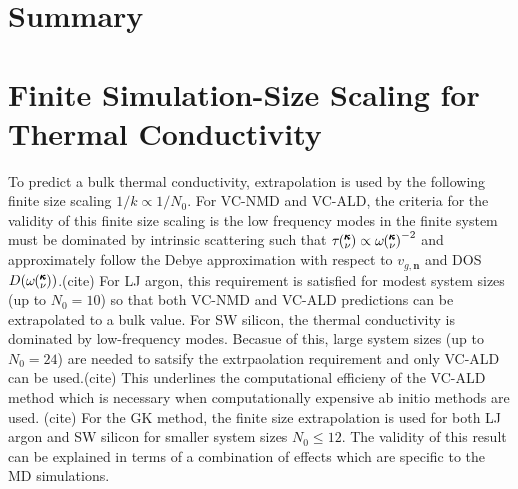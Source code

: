 \documentclass[aps,prb,twocolumn,superscriptaddress,preprintnumbers,amsmath,amssymb,floatfix]{revtex4}
\newcommand{\kv}{\mspace{-4.0mu}\left(\mspace{-8.0mu}
\begin{smallmatrix}&\pmb{\kappa} \\&\nu\end{smallmatrix}
\mspace{-3.0mu}\right)}
\begin{document}
\section{\label{S:}Summary}


\appendix

\section{\label{A-Finite-Sim}Finite Simulation-Size Scaling for Thermal 
Conductivity}
To predict a bulk thermal conductivity, extrapolation is used by the 
following finite size scaling $ 1 / k \propto 1/N_0$. For VC-NMD and 
VC-ALD, the criteria for the validity of this finite size scaling 
is the low frequency modes in the finite system must be dominated by 
intrinsic scattering such that $\tau\kv \propto \omega\kv^{-2}$ 
and approximately follow the Debye approximation 
with respect to $v_{g,\mathbf{n}}$ and DOS $D(\omega\kv)$.(cite) For LJ 
argon, this requirement is satisfied for modest system sizes 
(up to $N_0 = 10$) so that both VC-NMD and VC-ALD predictions can be 
extrapolated to a bulk value. 
For SW silicon, the thermal conductivity is dominated by low-frequency 
modes. Becasue of this, large system sizes (up to $N_0 = 24$) are needed 
to satsify the 
extrpaolation requirement and only VC-ALD can be used.(cite) This 
underlines the computational efficieny of the VC-ALD method which is 
necessary when computationally expensive ab initio methods are used.
(cite) For the GK method, the finite size extrapolation is used for 
both LJ argon and SW silicon for smaller system sizes $N_0 \le 12$. 
The validity of this result can be explained in terms of a 
combination of effects which are specific to the MD simulations.
\cite{esfarjani_heat_2011}

\clearpage


\end{document}

